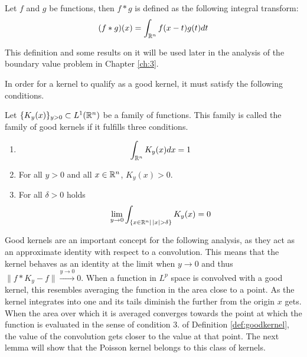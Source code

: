 \begin{definition}[Convolution]
    Let $f$ and $g$ be functions, then $f*g$ is defined as the following integral transform:
    \begin{equation*}
        (f*g)(x)=\int_{\mathbb R^n}f(x-t)g(t)dt
    \end{equation*}
\end{definition}
This definition and some results on it will be used later in the analysis of the boundary value problem in Chapter \ref{ch:3}.

In order for a kernel to qualify as a good kernel, it must satisfy the following conditions.

\begin{definition}\label{def:goodkernel}
    Let $\{K_y(x)\}_{y>0}\subset L^1(\mathbb R^n)$ be a family of functions. This family is called the family of good kernels if it fulfills three conditions.
    \begin{enumerate}
        \item \begin{equation*}
            \int_{\mathbb R^n}K_y(x)dx =1
        \end{equation*}
        \item For all $y>0$ and all $x\in\mathbb R^n$, $K_y(x)>0$.
        \item For all $\delta>0$ holds
        \begin{equation*}
            \lim_{y\rightarrow0}\int_{\{x\in\RR^n|\,|x|>\delta\}}K_y(x)=0
        \end{equation*}
    \end{enumerate}
\end{definition}
Good kernels are an important concept for the following analysis, as they act as an approximate identity with respect to a convolution. This means that the kernel behaves as an identity at the limit when $y\rightarrow0$ and thus $\|f*K_y-f\|\xrightarrow{y\rightarrow0}0$. When a function in $L^p$ space is convolved with a good kernel, this resembles averaging the function in the area close to a point. As the kernel integrates into one and its tails diminish the further from the origin $x$ gets. When the area over which it is averaged converges towards the point at which the function is evaluated in the sense of condition 3. of Definition \ref{def:goodkernel}, the value of the convolution gets closer to the value at that point. The next lemma will show that the Poisson kernel belongs to this class of kernels.

